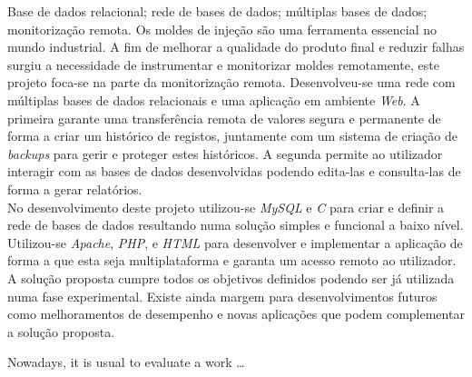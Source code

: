 \documentclass[11pt,twoside,a4paper]{report}
\begin{document}
\TitlePage
  \vspace*{55mm}
       {Base de dados relacional; rede de bases de dados; múltiplas bases de dados; monitorização remota.}
       {Os moldes de injeção são uma ferramenta essencial no mundo industrial. A fim de melhorar a qualidade do produto final e reduzir falhas surgiu a necessidade de instrumentar e monitorizar moldes remotamente, este projeto foca-se na parte da monitorização remota. Desenvolveu-se uma rede com múltiplas bases de dados relacionais e uma aplicação em ambiente \textit{Web}. A primeira garante uma transferência remota de valores segura e permanente de forma a criar um histórico de registos, juntamente com um sistema de criação de \textit{backups} para gerir e proteger estes históricos. A segunda permite ao utilizador interagir com as bases de dados desenvolvidas podendo edita-las e consulta-las de forma a gerar relatórios.\\
       No desenvolvimento deste projeto utilizou-se \textit{MySQL} e \textit{C} para criar e definir a rede de bases de dados resultando numa solução simples e funcional a baixo nível. Utilizou-se \textit{Apache}, \textit{PHP}, e \textit{HTML} para desenvolver e implementar a aplicação de forma a que esta seja multiplataforma e garanta um acesso remoto ao utilizador.\\
       A solução proposta cumpre todos os objetivos definidos podendo ser já utilizada numa fase experimental. Existe ainda margem para desenvolvimentos futuros como melhoramentos de desempenho e novas aplicações que podem complementar a solução proposta.}
\EndTitlePage
\titlepage\ \endtitlepage %

\TitlePage
  \vspace*{55mm}
       {Nowadays, it is usual to evaluate a work \ldots}
\EndTitlePage
\titlepage\ \endtitlepage %


%
%

\tableofcontents

\cleardoublepage
\listoffigures

\cleardoublepage
\listoftables



\cleardoublepage
{}
\end{document}
